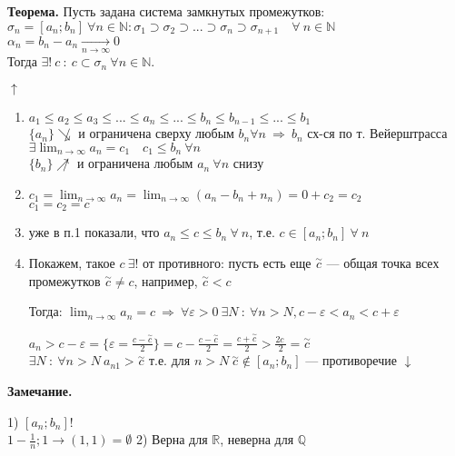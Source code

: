 \documentclass{article}
\begin{document}
\textbf{Теорема.} Пусть задана система замкнутых промежутков:\\
\(\sigma_n = [a_n; b_n]\ \forall n \in \mathbb{N}:\sigma_1 \supset \sigma_2 \supset ... \supset \sigma_n \supset \sigma_{n+1}\quad \forall\ n \in \mathbb{N}\)\\
\(\alpha_n = b_n - a_n \xrightarrow[n \rightarrow \infty]{} 0\)\\
Тогда \(\exists !\ c\ :\ c \subset \sigma_n\ \forall n \in \mathbb{N}\).

\(\uparrow\)
\begin{enumerate}
    \item \(a_1 \leq a_2 \leq a_3 \leq ... \leq a_n \leq ... \leq b_n \leq b_{n-1} \leq ... \leq b_1\)\\
\(\{ a_n \} \not\searrow\) и ограничена сверху любым \(b_n \forall n\ \Rightarrow\ b_n\) сх-ся по т. Вейерштрасса
\\\(\exists \lim_{n \rightarrow \infty}{a_n} = c_1 \quad c_1 \leq b_n \ \forall n\)
\\\(\{b_n\} \not\nearrow\) и ограничена любым \(a_n\ \forall n\) снизу
    \item \( c_1 = \lim_{n \rightarrow \infty} a_n = \lim_{n \rightarrow \infty} (a_n - b_n + n_n) = 0 + c_2 = c_2 \)\\
\( c_1 = c_2 = c \)\\
    \item уже в п.1 показали, что \(a_n \leq c \leq b_n\ \forall\ n\), т.е. \( c \in [a_n; b_n]\ \forall\ n \)
    \item Покажем, такое \( c\ \exists! \) от противного: пусть есть еще \( \overset{\sim}{c} \) --- общая точка всех промежутков \( \overset{\sim}{c} \neq c \), например, \( \overset{\sim}{c} < c \)

Тогда: \(\lim_{n \rightarrow \infty}{a_n} = c\ \Rightarrow\ \forall \varepsilon > 0 \ \exists N\ :\ \forall n > N, c - \varepsilon < a_n < c + \varepsilon\)

\(a_n > c - \varepsilon = \{\varepsilon = \frac{c-\overset{\sim}{c}}{2}\} = c - \frac{c - \overset{\sim}{c}}{2} = \frac{c + \overset{\sim}{c}}{2} > \frac{2c^{~}}{2} = \overset{\sim}{c}\)
\\\(\exists N\ :\ \forall n > N\ a_{n1} > \overset{\sim}{c}\) т.е. для \(n > N\ \overset{\sim}{c} \not\in [a_n; b_n]\) --- противоречие \(\downarrow\)
\end{enumerate}

\textbf{Замечание.}

1) \( [a_n; b_n]! \)\\
\( 1 - \frac{1}{n}; 1 \rightarrow (1, 1) = \emptyset \)
2) Верна для \(\mathbb{R}\), неверна для \(\mathbb{Q}\)
\end{document}
